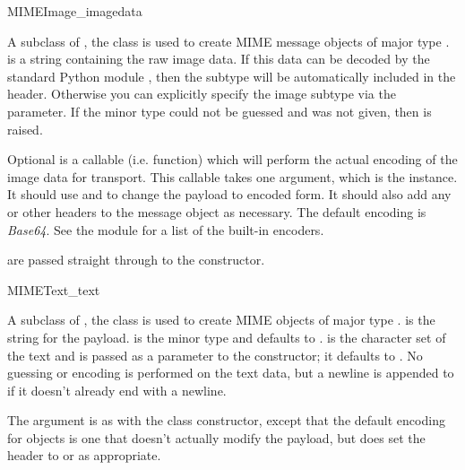 \begin{classdesc}{MIMEImage}{_imagedata}

A subclass of , the  class is used to
create MIME message objects of major type .
 is a string containing the raw image data.  If this
data can be decoded by the standard Python module ,
then the subtype will be automatically included in the
 header.  Otherwise you can explicitly specify the
image subtype via the  parameter.  If the minor type could
not be guessed and  was not given, then 
is raised.

Optional  is a callable (i.e. function) which will
perform the actual encoding of the image data for transport.  This
callable takes one argument, which is the  instance.
It should use  and  to
change the payload to encoded form.  It should also add any
 or other headers to the message
object as necessary.  The default encoding is \emph{Base64}.  See the
 module for a list of the built-in encoders.

 are passed straight through to the 
constructor.
\end{classdesc}

\begin{classdesc}{MIMEText}{_text}

A subclass of , the  class is used to
create MIME objects of major type .   is the
string for the payload.   is the minor type and defaults
to .   is the character set of the text and is
passed as a parameter to the  constructor; it defaults
to .  No guessing or encoding is performed on the text
data, but a newline is appended to  if it doesn't already
end with a newline.

The  argument is as with the  class
constructor, except that the default encoding for 
objects is one that doesn't actually modify the payload, but does set
the  header to  or
 as appropriate.
\end{classdesc}

